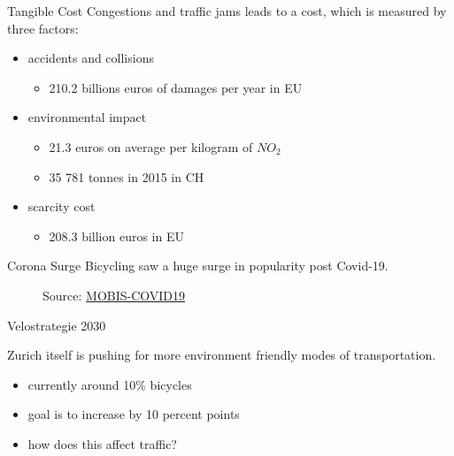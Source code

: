 \begin{frame}{Tangible Cost}
Congestions and traffic jams leads to a cost, which is measured by three factors:
\begin{itemize}
	\item<2->[-] accidents and collisions
        \begin{itemize}
            \item<3->[-] 210.2 billions euros of damages per year in EU \cite{eurocomm}
        \end{itemize}
	\item<4->[-] environmental impact
        \begin{itemize}
            \item<5->[-] 21.3 euros on average per kilogram of $NO_2$ \cite{swissno2}
            \item<6->[-] 35 781 tonnes in 2015 in CH \cite{swissno2}
        \end{itemize}
        \item<7->[-] scarcity cost
        \begin{itemize}
            \item<8->[-] 208.3 billion euros in EU \cite{eurocomm}
        \end{itemize}
\end{itemize}
\end{frame}




\begin{frame}{Corona Surge}
Bicycling saw a huge surge in popularity post Covid-19. 
	\begin{figure}
		\centering
{Source:  \href{https://ivtmobis.ethz.ch/mobis/covid19/reports/latest_de#MOBIS-COVID19}{MOBIS-COVID19}}
	\end{figure}
\end{frame}



\begin{frame}{Velostrategie 2030}
	\begin{multicols}{2}
        Zurich itself is pushing for more environment friendly modes of transportation. 
        \vspace{-1cm}
            \begin{itemize}
            \setlength\itemsep{4mm}
        	\item<2->[-] currently around 10\% bicycles \cite{bericht21}
        	\item<3->[-] goal is to increase by 10 percent points \cite{velo2030}
            \item<4->[-] how does this affect traffic?
		\end{itemize}
        \columnbreak
        \begin{figure}
	\end{figure}
	\end{multicols}
\end{frame}

